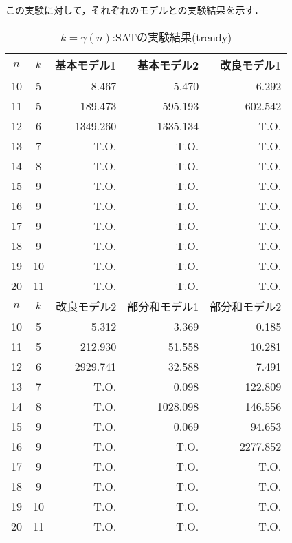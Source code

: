 この実験に対して，それぞれのモデルとの実験結果を示す．
\begin{table}[ht]
 \caption{$k=\gamma(n)$:SATの実験結果(trendy)}
 \label{tb:exSAT}
 \centering
 \begin{tabular}{|c|c|r|r|r|} \hline
  $n$ & $k$ & 基本モデル1 & 基本モデル2 & 改良モデル1 \\ \hline
  10 & 5 & 8.467 & 5.470 & 6.292 \\
  11 & 5 & 189.473 & 595.193 & 602.542 \\
  12 & 6 & 1349.260 & 1335.134 & T.O. \\
  13 & 7 & T.O. & T.O. & T.O. \\
  14 & 8 & T.O. & T.O. & T.O. \\
  15 & 9 & T.O. & T.O. & T.O. \\
  16 & 9 & T.O. & T.O. & T.O. \\
  17 & 9 & T.O. & T.O. & T.O. \\
  18 & 9 & T.O. & T.O. & T.O. \\
  19 & 10 & T.O. & T.O. & T.O. \\
  20 & 11 & T.O. & T.O. & T.O. \\ \hline \hline
  $n$ & $k$ & 改良モデル2 & 部分和モデル1 & 部分和モデル2 \\ \hline
  10 & 5 & 5.312 & 3.369 & 0.185 \\
  11 & 5 & 212.930 & 51.558 & 10.281 \\
  12 & 6 & 2929.741 & 32.588 & 7.491 \\
  13 & 7 & T.O. & 0.098 & 122.809 \\
  14 & 8 & T.O. & 1028.098 & 146.556 \\
  15 & 9 & T.O. & 0.069 & 94.653 \\
  16 & 9 & T.O. & T.O. & 2277.852 \\
  17 & 9 & T.O. & T.O. & T.O. \\
  18 & 9 & T.O. & T.O. & T.O. \\
  19 & 10 & T.O. & T.O. & T.O.  \\
  20 & 11 & T.O. & T.O. & T.O. \\ \hline
 \end{tabular}
\end{table}

